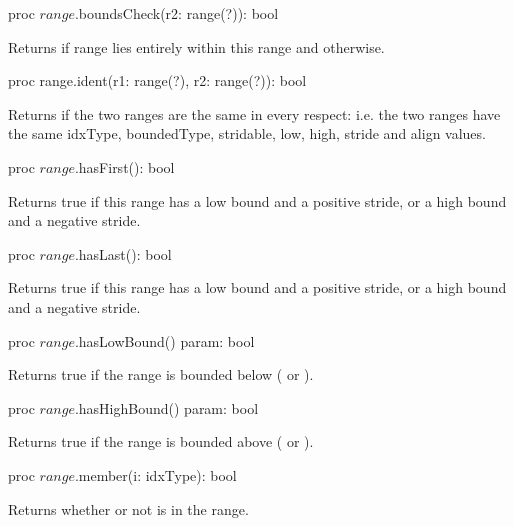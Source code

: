 \begin{protohead}
proc $range$.boundsCheck(r2: range(?)): bool
\end{protohead}
\begin{protobody}
Returns  if range  lies entirely within this range
and  otherwise.  
\end{protobody}

\begin{protohead}
proc range.ident(r1: range(?), r2: range(?)): bool
\end{protohead}
\begin{protobody}
Returns  if the two ranges are the same in every respect: i.e. the
two ranges have the same idxType,
boundedType, stridable, low, high, stride and
align values.
\end{protobody}

\begin{protohead}
proc $range$.hasFirst(): bool
\end{protohead}
\begin{protobody}
Returns true if this range has a low bound and a positive stride, or a high
bound and a negative stride.
\end{protobody}

\begin{protohead}
proc $range$.hasLast(): bool
\end{protohead}
\begin{protobody}
Returns true if this range has a low bound and a positive stride, or a high
bound and a negative stride.
\end{protobody}

\begin{protohead}
proc $range$.hasLowBound() param: bool
\end{protohead}
\begin{protobody}
Returns true if the range is bounded below ( or ).
\end{protobody}

\begin{protohead}
proc $range$.hasHighBound() param: bool
\end{protohead}
\begin{protobody}
Returns true if the range is bounded above ( or ).
\end{protobody}

\begin{protohead}
proc $range$.member(i: idxType): bool
\end{protohead}
\begin{protobody}
Returns whether or not  is in the range.
\end{protobody}

